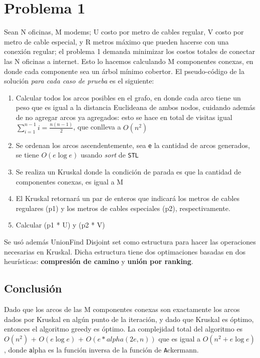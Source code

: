 \documentclass[a4paper,14pt,spanish]{article}
\begin{document}
\section{Problema 1}
Sean N oficinas, M modems; U costo por metro de cables regular, V costo por metro de cable especial, y R metros máximo
que pueden hacerse con una conexión regular;
el problema 1 demanda minimizar los costos totales de conectar las N oficinas a internet. Esto lo hacemos calculando M componentes
conexas, en donde cada componente sea un árbol mínimo cobertor. El pseudo-código de la solución \emph{para cada caso de prueba} es el siguiente:
    \begin{enumerate}
        \item Calcular todos los arcos posibles en el grafo, en donde cada arco tiene un peso
              que es igual a la distancia Euclideana de ambos nodos, cuidando además de no agregar arcos ya agregados:
              esto se hace en total de visitas igual $\displaystyle\sum\limits_{i=1}^{n-1} i = \frac{n(n-1)}{2}$, que conlleva a $O(n^2)$
        \item Se ordenan los arcos ascendentemente, sea \texttt e la cantidad de arcos generados, se tiene $O(e\log{}e)$ usando \emph{sort} de \texttt {STL}
        \item Se realiza un Kruskal donde la condición de parada es que la cantidad de componentes conexas, es igual a M
        \item El Kruskal retornará un par de enteros que indicará los metros de cables regulares (p1) y los metros de cables especiales (p2), respectivamente.
        \item Calcular (p1 * U) y (p2 * V)
    \end{enumerate}

Se usó además UnionFind Disjoint set como estructura para hacer las operaciones necesarias en Kruskal. Dicha estructura tiene dos optimaciones basadas en dos heurísticas:
{\bf compresión de camino} y {\bf unión por ranking}.

\subsection{Conclusión}
Dado que los arcos de las M componentes conexas son exactamente los arcos dados por Kruskal en algún punto de la iteración, y dado que Kruskal es óptimo,
entonces el algoritmo greedy es óptimo. La complejidad total del algoritmo es $O(n^2)$ + $O(e\log{}e)$ + $O(e*alpha(2e,n))$ que es igual
a $O(n^2 + e\log{}e)$, donde \texttt alpha es la función inversa de la función de \texttt Ackermann.
\end{document}
